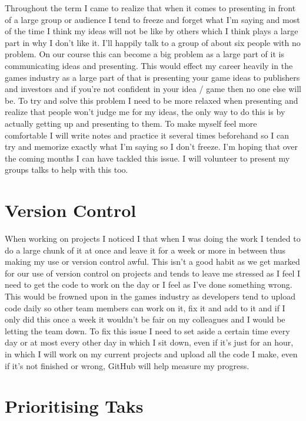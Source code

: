 \documentclass{scrartcl}
\begin{document}
Throughout the term I came to realize that when it comes to presenting in front of a large group or audience I tend to freeze and forget what I'm saying and most of the time I think my ideas will not be like by others which I think plays a large part in why I don't like it. I'll happily talk to a group of about six people with no problem. On our course this can become a big problem as a large part of it is communicating ideas and presenting. This would effect my career heavily in the games industry as a large part of that is presenting your game ideas to publishers and investors and if you're not confident in your idea / game then no one else will be. To try and solve this problem I need to be more relaxed when presenting and realize that people won't judge me for my ideas, the only way to do this is by actually getting up and presenting to them. To make myself feel more comfortable I will write notes and practice it several times beforehand so I can try and memorize exactly what I'm saying so I don't freeze. I'm hoping that over the coming months I can have tackled this issue. I will volunteer to present my groups talks to help with this too.

\section{Version Control}

When working on projects I noticed I that when I was doing the work I tended to do a large chunk of it at once and leave it for a week or more in between thus making my use or version control awful. This isn't a good habit as we get marked for our use of version control on projects and tends to leave me stressed as I feel I need to get the code to work on the day or I feel as I've done something wrong. This would be frowned upon in the games industry as developers tend to upload code daily so other team members can work on it, fix it and add to it and if I only did this once a week it wouldn't be fair on my colleagues and I would be letting the team down. To fix this issue I need to set aside a certain time every day or at most every other day in which I sit down, even if it's just for an hour, in which I will work on my current projects and upload all the code I make, even if it's not finished or wrong, GitHub will help measure my progress.

\section{Prioritising Taks}
\end{document}
